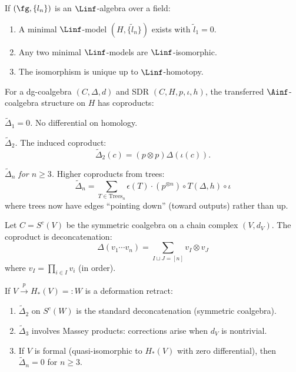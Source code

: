 \begin{theorem}
\label{thm:linf-minimal-unique}
If $(\fg, \{l_n\})$ is an $\Linf$-algebra over a field:
\begin{enumerate}[label=(\roman*)]
\item A minimal $\Linf$-model $(H, \{\tilde{l}_n\})$ exists with $\tilde{l}_1 = 0$.
\item Any two minimal $\Linf$-models are $\Linf$-isomorphic.
\item The isomorphism is unique up to $\Linf$-homotopy.
\end{enumerate}
\end{theorem}

\begin{construction}
\label{constr:htt-coalg}
For a dg-coalgebra $(C, \Delta, d)$ and SDR $(C, H, p, \iota, h)$, the transferred
$\Ainf$-coalgebra structure on $H$ has coproducts:

\emph{$\tilde{\Delta}_1 = 0$.} No differential on homology.

\emph{$\tilde{\Delta}_2$.} The induced coproduct:
\[
\tilde{\Delta}_2(c) = (p \otimes p) \Delta(\iota(c)).
\]

\emph{$\tilde{\Delta}_n$ for $n \geq 3$.} Higher coproducts from trees:
\[
\tilde{\Delta}_n = \sum_{T \in \mathrm{Trees}_n} \epsilon(T) \cdot (p^{\otimes n}) \circ T(\Delta, h) \circ \iota
\]
where trees now have edges ``pointing down'' (toward outputs) rather than up.
\end{construction}

\begin{example}
\label{ex:transfer-sym-coalg}
Let $C = S^c(V)$ be the symmetric coalgebra on a chain complex $(V, d_V)$.
The coproduct is deconcatenation:
\[
\Delta(v_1 \cdots v_n) = \sum_{I \sqcup J = [n]} v_I \otimes v_J
\]
where $v_I = \prod_{i \in I} v_i$ (in order).

If $V \xrightarrow{p} H_*(V) =: W$ is a deformation retract:
\begin{enumerate}[label=(\roman*)]
\item $\tilde{\Delta}_2$ on $S^c(W)$ is the standard deconcatenation (symmetric coalgebra).
\item $\tilde{\Delta}_3$ involves Massey products: corrections arise when $d_V$ is nontrivial.
\item If $V$ is formal (quasi-isomorphic to $H_*(V)$ with zero differential), then $\tilde{\Delta}_n = 0$ for $n \geq 3$.
\end{enumerate}
\end{example}


